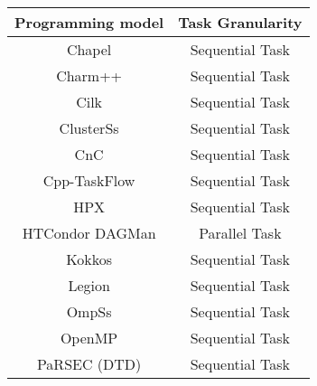 \begin{tabular}{cc}
\hline
Programming model & Task Granularity \\
\hline
Chapel & Sequential Task\\
Charm++ & Sequential Task\\
Cilk & Sequential Task\\
ClusterSs & Sequential Task\\
CnC & Sequential Task\\
Cpp-TaskFlow & Sequential Task\\
HPX & Sequential Task\\
HTCondor DAGMan & Parallel Task\\
Kokkos & Sequential Task\\
Legion & Sequential Task\\
OmpSs & Sequential Task\\
OpenMP & Sequential Task\\
PaRSEC (DTD) & Sequential Task\\
\hline
\end{tabular}
